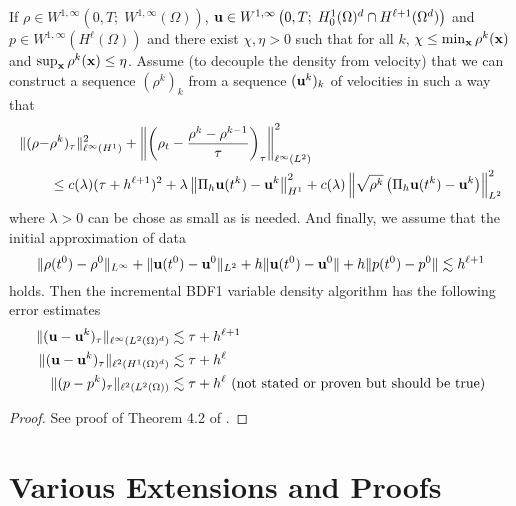 \documentclass[letterpaper]{erdc}
\begin{document}
\begin{theorem}
If $\rho \in W^{1,\infty}\left(0,T; \; W^{1,\infty}(\Omega) \right)$, $\textbf{u} \in W^{1,\infty}\left(0,T;\; H^1_0(\Omega)^d\cap H^{\ell+1}(\Omega^d) \right)$ and $p\in W^{1,\infty}\left( H^{\ell}(\Omega)\right)$ and there exist $\chi, \eta >0 $ such that for all $k$, $\chi \leq \min_{\textbf{x}} \rho^k(\textbf{x})$ and $\sup_{\textbf{x}} \rho^k(\textbf{x}) \leq \eta$. Assume (to decouple the density from velocity) that we can construct a sequence $(\rho^k)_k$ from a sequence $(\textbf{u}^k)_k$ of velocities in such a way that
\begin{align}
  \|(\rho - &\rho^k)_{\tau}\|^2_{\ell^{\infty}(H^1)} + \left\| \left( \rho_t - \frac{\rho^k - \rho^{k-1}}{\tau} \right)_{\tau} \right\|^2_{\ell^{\infty}(L^2)}\\
  &\leq c(\lambda)(\tau + h^{\ell+1})^2 + \lambda \left\| \Pi_h\textbf{u}(t^k) - \textbf{u}^k  \right\|^2_{H^1} + c(\lambda)\left\|\sqrt{\rho^k} \left(\Pi_h\textbf{u}(t^k) - \textbf{u}^k\right)\right\|^2_{L^2}
  \end{align}
  where $\lambda>0$ can be chose as small as is needed. And finally, we assume that the initial approximation of data 
  \begin{equation}
    \|\rho(t^0) - \rho^0\|_{L^{\infty}} + \|\textbf{u}(t^0)-\textbf{u}^{0}\|_{L^2} + h\|\textbf{u}(t^0) - \textbf{u}^0\| + h\|p(t^0) - p^0\| \lesssim h^{\ell+1}
  \end{equation}
  holds.  Then the incremental BDF1 variable density algorithm has the following error estimates
  \begin{align}
    \|(\textbf{u} - \textbf{u}^k)_{\tau}\|_{\ell^{\infty}(L^2(\Omega)^d)} &\lesssim \tau + h^{\ell+1}\\
    \|(\textbf{u} - \textbf{u}^k)_{\tau}\|_{\ell^{2}(H^1(\Omega)^d)} &\lesssim \tau + h^{\ell}\\
    \|(p - p^k)_{\tau}\|_{\ell^{2}(L^2(\Omega))} & \lesssim \tau + h^{\ell}  \mbox{  (not stated or proven but should be true)}
  \end{align}
\end{theorem}
\begin{proof}
  See proof of Theorem 4.2 of \cite{guermond2011error}.
\end{proof}


\appendix
%
%
%
%
\chapter{Various Extensions and Proofs}

%
%
%
\end{document}
